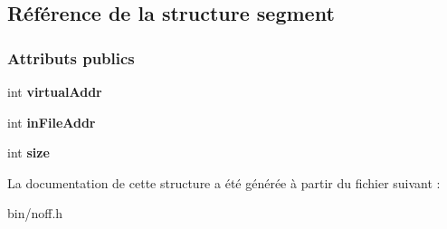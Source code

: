 \hypertarget{structsegment}{}\subsection{Référence de la structure segment}
\label{structsegment}
\subsubsection*{Attributs publics}
\begin{DoxyCompactItemize}
\item 
\hypertarget{structsegment_ae09b72dddf5782c1413ae109937bfd49}{}\label{structsegment_ae09b72dddf5782c1413ae109937bfd49} 
int {\bfseries virtual\+Addr}
\item 
\hypertarget{structsegment_a52a7100e23e0cbada6befc886a4aa6ab}{}\label{structsegment_a52a7100e23e0cbada6befc886a4aa6ab} 
int {\bfseries in\+File\+Addr}
\item 
\hypertarget{structsegment_a32d32a1ee6553ade5d25c1547db5b46a}{}\label{structsegment_a32d32a1ee6553ade5d25c1547db5b46a} 
int {\bfseries size}
\end{DoxyCompactItemize}


La documentation de cette structure a été générée à partir du fichier suivant \+:\begin{DoxyCompactItemize}
\item 
bin/noff.\+h\end{DoxyCompactItemize}
